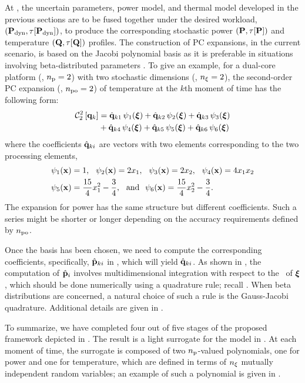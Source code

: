 At , the uncertain parameters, power model, and thermal model developed in the previous sections are to be fused together under the desired workload, $\profilePdyn$, to produce the corresponding stochastic power $\profileP$ and temperature $\profileT$ profiles.
The construction of PC expansions, in the current scenario, is based on the Jacobi polynomial basis as it is preferable in situations involving beta-distributed parameters \cite{xiu2010}.
To give an example, for a dual-core platform (\ie, ${n_\text{p}} = 2$) with two stochastic dimensions (\ie, ${n_\xi} = 2$), the second-order PC expansion (\ie, ${n_\text{po}} = 2$) of temperature at the $k$th moment of time has the following form:
\begin{align}
  \oPC{2}{2}{\vTO_k} &= \pcc{\vTO}_{k1} \, \pcb_1(\vZ) + \pcc{\vTO}_{k2} \, \pcb_2(\vZ) + \pcc{\vTO}_{k3} \, \pcb_3(\vZ) \nonumber \\
  & {} + \pcc{\vTO}_{k4} \, \pcb_4(\vZ) + \pcc{\vTO}_{k5} \, \pcb_5(\vZ) + \pcc{\vTO}_{k6} \, \pcb_6(\vZ) \elabel{pc-example}
\end{align}
where the coefficients $\hat{\mathbf{q}}_{ki}$ are vectors with two elements corresponding to the two processing elements,
\begin{align*}
  & \psi_1(\mathbf{x}) = 1, \hspace{0.7em} \psi_2(\mathbf{x}) = 2 x_1, \hspace{0.7em} \psi_3(\mathbf{x}) = 2 x_2, \hspace{0.7em} \psi_4(\mathbf{x}) = 4 x_1 x_2 \\
  & \psi_5(\mathbf{x}) = \frac{15}{4} x_1^2 - \frac{3}{4}, \hspace{0.7em} \text{and} \hspace{0.7em} \psi_6(\mathbf{x}) = \frac{15}{4} x_2^2 - \frac{3}{4}.
\end{align*}
The expansion for power has the same structure but different coefficients.
Such a series might be shorter or longer depending on the accuracy requirements defined by ${n_\text{po}}$.

Once the basis has been chosen, we need to compute the corresponding coefficients, specifically, $\hat{\mathbf{p}}_{ki}$ in , which will yield $\hat{\mathbf{q}}_{ki}$.
As shown in , the computation of $\hat{\mathbf{p}}_i$ involves multidimensional integration with respect to the \pdf\ of $\boldsymbol{\xi}$, which should be done numerically using a quadrature rule; recall .
When beta distributions are concerned, a natural choice of such a rule is the Gauss-Jacobi quadrature.
Additional details are given in .

To summarize, we have completed four out of five stages of the proposed framework depicted in .
The result is a light surrogate for the model in .
At each moment of time, the surrogate is composed of two ${n_\text{p}}$-valued polynomials, one for power and one for temperature, which are defined in terms of ${n_\xi}$ mutually independent random variables; an example of such a polynomial is given in .
